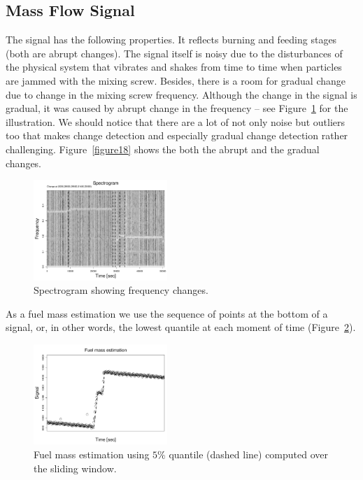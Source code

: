 \subsection{Mass Flow Signal}

The signal has the following properties. It reflects burning and feeding stages (both are abrupt changes).
The signal itself is noisy due to the disturbances of the physical system that vibrates and shakes from time to time when particles are jammed with the mixing screw.
Besides, there is a room for gradual change due to change in the mixing screw frequency.
Although the change in the signal is gradual, it was caused by abrupt change in the frequency -- see Figure~\ref{figure15} for the illustration.
We should notice that there are a lot of not only noise but outliers too that
makes change detection and especially gradual change detection rather challenging.
Figure~\ref{figure18} shows the both the abrupt and the gradual changes.

\begin{figure}[htb!]
\includegraphics[width=0.45\textwidth]{pics/cfb_paper/OMF/OMFspg}
\caption{Spectrogram showing frequency changes.}\label{figure15}
\end{figure}

As a fuel mass estimation we use the sequence of points at the bottom of a signal, or, in other words, the lowest quantile at each moment of time (Figure~\ref{figure16}).

\begin{figure}[htb!]
\includegraphics[width=0.45\textwidth]{pics/cfb_paper/OMF/OMFestim2}
\caption{Fuel mass estimation using $5\%$ quantile (dashed line) computed over the sliding window.}\label{figure16}
\end{figure}

